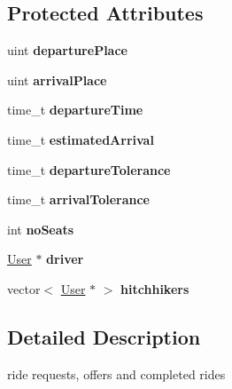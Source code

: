\subsection*{Protected Attributes}
\begin{DoxyCompactItemize}
\item 
uint {\bfseries departure\+Place}\hypertarget{class_ride_a176632238cfffb2d7fc889d233261fa0}{}\label{class_ride_a176632238cfffb2d7fc889d233261fa0}

\item 
uint {\bfseries arrival\+Place}\hypertarget{class_ride_a9d3d96a9aeb76232bc07c52461cdc4ac}{}\label{class_ride_a9d3d96a9aeb76232bc07c52461cdc4ac}

\item 
time\+\_\+t {\bfseries departure\+Time}\hypertarget{class_ride_ac3dd5b37d7ba828e6635a944425e6ace}{}\label{class_ride_ac3dd5b37d7ba828e6635a944425e6ace}

\item 
time\+\_\+t {\bfseries estimated\+Arrival}\hypertarget{class_ride_ad4e0009e20129189e804b8cf7ad1766a}{}\label{class_ride_ad4e0009e20129189e804b8cf7ad1766a}

\item 
time\+\_\+t {\bfseries departure\+Tolerance}\hypertarget{class_ride_a668eeee90fb137d28ca2ce84345237bd}{}\label{class_ride_a668eeee90fb137d28ca2ce84345237bd}

\item 
time\+\_\+t {\bfseries arrival\+Tolerance}\hypertarget{class_ride_ab6932b92492a60844ac831380ebf2e0d}{}\label{class_ride_ab6932b92492a60844ac831380ebf2e0d}

\item 
int {\bfseries no\+Seats}\hypertarget{class_ride_a3e8ba79aefe64707fabfec0eed092784}{}\label{class_ride_a3e8ba79aefe64707fabfec0eed092784}

\item 
\hyperlink{class_user}{User} $\ast$ {\bfseries driver}\hypertarget{class_ride_ad3855a5fce1f26c871ae3c70dfee6137}{}\label{class_ride_ad3855a5fce1f26c871ae3c70dfee6137}

\item 
vector$<$ \hyperlink{class_user}{User} $\ast$ $>$ {\bfseries hitchhikers}\hypertarget{class_ride_a0b0d7418f91b2991c199901b6cf48801}{}\label{class_ride_a0b0d7418f91b2991c199901b6cf48801}

\end{DoxyCompactItemize}


\subsection{Detailed Description}
ride requests, offers and completed rides 

